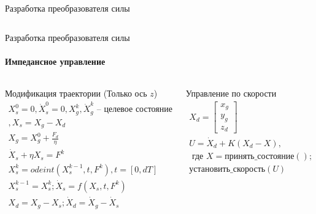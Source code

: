 \documentclass[aspectratio=169,xcolor=table]{beamer}
\begin{document}
\begin{frame}[t]{Разработка преобразователя силы}
\begin{columns}[T,onlytextwidth]
\begin{column}{0.39\textwidth}
        \end{column}
    \end{columns}
\end{frame}


\begin{frame}[t]{Разработка преобразователя силы}
    \framesubtitle{Импедансное управление}
    \vspace{-18pt}
    \begin{columns}[T,onlytextwidth]
        \begin{column}{0.55\textwidth}
            \begin{exampleblock}{Модификация траектории (Только ось $z$)}
                \vspace{-14pt}
                \begin{eqnarray*}
                    X_s^0 = 0, \dot{X}_s^0 =0,  X_g^k, \dot{X}_g^k \text{ -- целевое состояние}\\, X_s = X_g - X_d \\
                    X_g = X_g^0 + \frac{F_d}{\eta } \\
                    \dot{X}_s + \eta  X_s = F^k \\
                    X_s^k = odeint(X_s^{k-1},t,F^k), t = [0,dT] \\
                    X_s^{k-1} = X_s^k;  \dot{X}_s = f(X_s,t,F^k) \\
                    X_d = X_g - X_s; \dot{X}_d = \dot{X}_g - \dot{X}_s
                \end{eqnarray*}
            \end{exampleblock}
        \end{column}
        \begin{column}{0.40\textwidth}
            \begin{exampleblock}{Управление по скорости}
                \vspace{-14pt}
                \begin{eqnarray*}
                    X_d = \begin{bmatrix}
                        x_g \\ y_g \\ z_d
                    \end{bmatrix} \\
                    U = \dot{X}_d + K(X_d - X), \\ \text{ где } X=\text{принять\_состояние}(); \\
                    \text{установить\_скорость}(U)
                \end{eqnarray*}
            \end{exampleblock}
        \end{column}
    \end{columns}
\end{frame}
\end{document}
